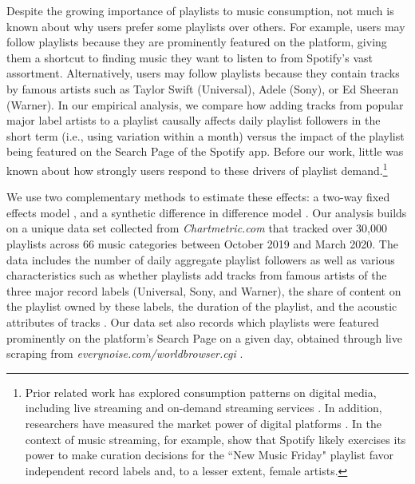 \documentclass[12pt, a4paper, leqno]{article}
\begin{document}
Despite the growing importance of playlists to music consumption, not much is known about why users prefer some playlists over others. For example, users may follow playlists because they are prominently featured on the platform, giving them a shortcut to finding music they want to listen to from Spotify's vast assortment. Alternatively, users may follow playlists because they contain tracks by famous artists such as Taylor Swift (Universal), Adele (Sony), or Ed Sheeran (Warner). In our empirical analysis, we compare how adding tracks from popular major label artists to a playlist causally affects daily playlist followers in the short term (i.e., using variation within a month) versus the impact of the playlist being featured on the Search Page of the Spotify app. Before our work, little was known about how strongly users respond to these drivers of playlist demand.\footnote{Prior related work has explored consumption patterns on digital media, including live streaming \citep[e.g.,][]{Live_streaming_MKTSCIE_21,jmr_livestreaming} and on-demand streaming services \citep[e.g.,][]{wlomert2023frontiers,Datta_etal_MktScie}. In addition, researchers have measured the market power of digital platforms \citep[e.g.,][]{ review_platform_power_23,economics_two_sided_markets,platform_power_Song_2021}. In the context of music streaming, for example, \cite{playlistbias} show that Spotify likely exercises its power to make curation decisions for the ``New Music Friday" playlist favor independent record labels and, to a lesser extent, female artists.}

We use two complementary methods to estimate these effects: a two-way fixed effects model \citep[e.g.,][]{shapiro_hitsch_tuchman_2021}, and a synthetic difference in difference model  
\citep[e.g.,][]{SDiD_AER_Arkhangelsky_21}. Our analysis builds on a unique data set collected from \textit{Chartmetric.com} that tracked over 30,000 playlists across 66 music categories between October 2019 and March 2020. The data includes the number of daily aggregate playlist followers as well as various characteristics such as whether playlists add tracks from famous artists of the three major record labels (Universal, Sony, and Warner), the share of content on the playlist owned by these labels, the duration of the playlist, and the acoustic attributes of tracks \citep{boughanmiacoustics}. Our data set also records which playlists were featured prominently on the platform's Search Page on a given day, obtained through live scraping from \textit{everynoise.com/worldbrowser.cgi} \citep{scraping}.
\end{document}
